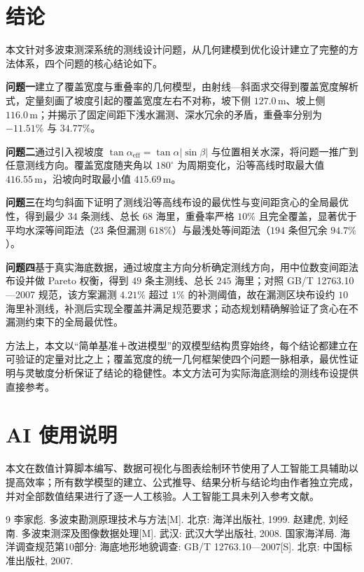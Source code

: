 \documentclass[12pt]{ctexart}
\begin{document}
\section{结论}

本文针对多波束测深系统的测线设计问题，从几何建模到优化设计建立了完整的方法体系，四个问题的核心结论如下。

\textbf{问题一}建立了覆盖宽度与重叠率的几何模型，由射线—斜面求交得到覆盖宽度解析式，定量刻画了坡度引起的覆盖宽度左右不对称，坡下侧 $127.0\,\mathrm{m}$、坡上侧 $116.0\,\mathrm{m}$；并揭示了固定间距下浅水漏测、深水冗余的矛盾，重叠率分别为 $-11.51\%$ 与 $34.77\%$。

\textbf{问题二}通过引入视坡度 $\tan\alpha_{\mathrm{eff}}=\tan\alpha|\sin\beta|$ 与位置相关水深，将问题一推广到任意测线方向。覆盖宽度随夹角以 $180^\circ$ 为周期变化，沿等高线时取最大值 $416.55\,\mathrm{m}$，沿坡向时取最小值 $415.69\,\mathrm{m}$。

\textbf{问题三}在均匀斜面下证明了测线沿等高线布设的最优性与变间距贪心的全局最优性，得到最少 $34$ 条测线、总长 $68$ 海里，重叠率严格 $10\%$ 且完全覆盖，显著优于平均水深等间距法（$23$ 条但漏测 $618\%$）与最浅处等间距法（$194$ 条但冗余 $94.7\%$）。

\textbf{问题四}基于真实海底数据，通过坡度主方向分析确定测线方向，用中位数变间距法布设并做 Pareto 权衡，得到 $49$ 条主测线、总长 $245$ 海里；对照 GB/T 12763.10—2007 规范，该方案漏测 $4.21\%$ 超过 $1\%$ 的补测阈值，故在漏测区块布设约 $10$ 海里补测线，补测后实现全覆盖并满足规范要求；动态规划精确解验证了贪心在不漏测约束下的全局最优性。

方法上，本文以``简单基准＋改进模型''的双模型结构贯穿始终，每个结论都建立在可验证的定量对比之上；覆盖宽度的统一几何框架使四个问题一脉相承，最优性证明与灵敏度分析保证了结论的稳健性。本文方法可为实际海底测绘的测线布设提供直接参考。

\section*{AI 使用说明}

本文在数值计算脚本编写、数据可视化与图表绘制环节使用了人工智能工具辅助以提高效率；所有数学模型的建立、公式推导、结果分析与结论均由作者独立完成，并对全部数值结果进行了逐一人工核验。人工智能工具未列入参考文献。

\begin{thebibliography}{9}
 李家彪. 多波束勘测原理技术与方法[M]. 北京: 海洋出版社, 1999.
 赵建虎, 刘经南. 多波束测深及图像数据处理[M]. 武汉: 武汉大学出版社, 2008.
 国家海洋局. 海洋调查规范第10部分: 海底地形地貌调查: GB/T 12763.10—2007[S]. 北京: 中国标准出版社, 2007.
\end{thebibliography}
\end{document}
